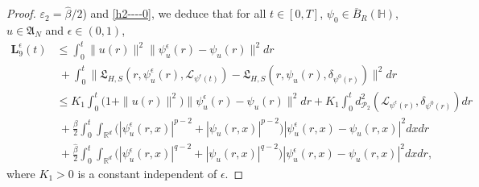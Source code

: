 \documentclass[11pt]{article}
\renewcommand{\leq}{\leqslant}
\numberwithin{equation}{section}
\begin{document}
\begin{proof}
$\varepsilon_2=\widehat{\beta}/2$) and \eqref{h2----0},
we deduce that for all $t\in[0,T]$, $\psi_{0}\in \overline{B}_{R}(\mathbb{H})$,
$u\in \mathfrak{A}_N$ and $\epsilon\in(0,1)$,
\begin{align}
\label{SCE6}
\textbf{L}^\epsilon_{9}(t)
&\leq
\int_0^{t}
\|u(r)\|^2\|\psi^\epsilon_u(r)
-\psi_u(r)
\|^2dr\nonumber\\&\ +
\int_0^{t}
    \big\|\mathfrak{L}_{H,S}(r,\psi^\epsilon_u(r),
\mathcal{L}_{
\psi^\epsilon(t)}) - \mathfrak{L}_{H,S}(r,\psi_u(r),
\delta_{\psi^0(r)})
\big\|^2 dr
\nonumber\\&\leq K_1
\int_0^{t}
\big(1
+\|u(r)\|^2\big)\|\psi^\epsilon_u(r)
-\psi_u(r)
\|^2dr
+ K_1\int_0^{t}
d_{\mathcal{P}_2}^2
(\mathcal{L}_{
\psi^\epsilon(r)},\delta_{\psi^0(r)})dr
\nonumber\\&\ +\frac{\beta}{2}\int_0^{t} \int_{\mathbb{R}^d}  \big(|\psi^\epsilon_u(r,x)|^{p-2}
+|\psi_u(r,x)|^{p-2}\big)
|\psi^\epsilon_u(r,x)-\psi_u(r,x)|^2dxdr
\nonumber\\&\ +\frac{\widehat{\beta}}{2}
\int_0^{t} \int_{\mathbb{R}^d}  \big(|\psi^\epsilon_u(r,x)|^{q-2}
+|\psi_u(r,x)|^{q-2}\big)
|\psi^\epsilon_u(r,x)-\psi_u(r,x)|^2dxdr,
\end{align}
where $K_1>0$ is a constant independent of $\epsilon$.


\end{proof}
\end{document}
